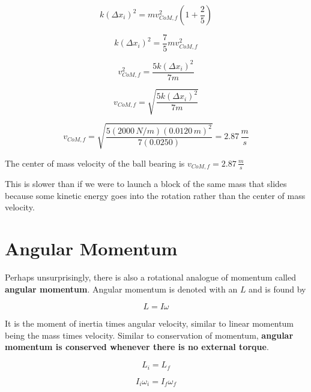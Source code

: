 \documentclass[12pt]{book}
\begin{document}
\begin{exampleblock}
\begin{equation}
k (\Delta x_i)^2 = m v_{CoM,f}^2 \left(1 + \frac{2}{5} \right)
\end{equation}


\begin{equation}
k (\Delta x_i)^2 = \frac{7}{5} m v_{CoM,f}^2
\end{equation}

\begin{equation}
v_{CoM,f}^2 = \frac{5 k (\Delta x_i)^2}{7 m}
\end{equation}

\begin{equation}
v_{CoM,f} = \sqrt{\frac{5 k (\Delta x_i)^2}{7 m}}
\end{equation}

\begin{equation}
v_{CoM,f} = \sqrt{\frac{5 (2000 \, N/m)(0.0120 \, m)^2}{7 (0.0250)}} = 2.87 \, \frac{m}{s}
\end{equation}

The center of mass velocity of the ball bearing is $v_{CoM,f} = 2.87 \, \frac{m}{s}$

\end{exampleblock}

This is slower than if we were to launch a block of the same mass that slides because some kinetic energy goes into the rotation rather than the center of mass velocity.

\section{Angular Momentum}

Perhaps unsurprisingly, there is also a rotational analogue of momentum called \textbf{angular momentum}. Angular momentum is denoted with an $L$ and is found by

\begin{equation}
L = I \omega
\end{equation}

It is the moment of inertia times angular velocity, similar to linear momentum being the mass times velocity. Similar to conservation of momentum, \textbf{angular momentum is conserved whenever there is no external torque}.

\begin{equation}
L_i = L_f
\end{equation}

\begin{equation}
I_i \omega_i = I_f \omega_f
\end{equation}
\end{document}
